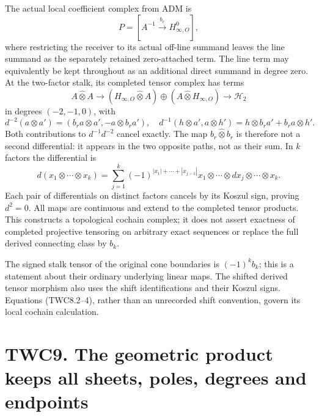 The actual local coefficient complex from ADM is \[
P=[A^{-1}\xrightarrow{b_r}H_{\infty,O}^0],
\tag{TWC8.1}
\] where restricting the receiver to its actual off-line summand leaves
the line summand as the separately retained zero-attached term. The line
term may equivalently be kept throughout as an additional direct summand
in degree zero. At the two-factor stalk, its completed tensor complex
has terms \[
A\widehat\otimes A\longrightarrow
(H_{\infty,O}\widehat\otimes A)\oplus(A\widehat\otimes H_{\infty,O})
\longrightarrow\mathscr H_2
\tag{TWC8.2}
\] in degrees \((-2,-1,0)\), with \[
d^{-2}(a\otimes a')=(b_ra\otimes a',-a\otimes b_ra'),
\quad d^{-1}(h\otimes a',a\otimes h')=h\otimes b_ra'+b_ra\otimes h'.
\tag{TWC8.3}
\] Both contributions to \(d^{-1}d^{-2}\) cancel exactly. The map
\(b_r\widehat\otimes b_r\) is therefore not a second differential: it
appears in the two opposite paths, not as their sum. In \(k\) factors
the differential is \[
d(x_1\otimes\cdots\otimes x_k)=
\sum_{j=1}^k(-1)^{|x_1|+\cdots+|x_{j-1}|}
 x_1\otimes\cdots\otimes dx_j\otimes\cdots\otimes x_k.
\tag{TWC8.4}
\] Each pair of differentials on distinct factors cancels by its Koszul
sign, proving \(d^2=0\). All maps are continuous and extend to the
completed tensor products. This constructs a topological cochain
complex; it does not assert exactness of completed projective tensoring
on arbitrary exact sequences or replace the full derived connecting
class by \(b_k\).

The signed stalk tensor of the original cone boundaries is
\((-1)^kb_k\); this is a statement about their ordinary underlying
linear maps. The shifted derived tensor morphism also uses the shift
identifications and their Koszul signs. Equations (TWC8.2--4), rather
than an unrecorded shift convention, govern its local cochain
calculation.

\section{TWC9. The geometric product keeps all sheets, poles, degrees
and
endpoints}\label{twc9.-the-geometric-product-keeps-all-sheets-poles-degrees-and-endpoints}

